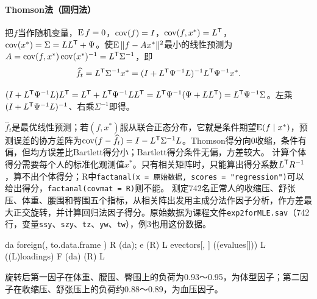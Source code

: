 \paragraph{Thomson法（回归法）} 把$f$当作随机变量，$\operatorname{E} f=0$，$\operatorname{cov}(f)=I$，$\operatorname{cov}(f,x^*)=L^{\mathsf T}$，$\operatorname{cov}(x^*)=\Sigma=LL^{\mathsf T}+\Psi$。使$\operatorname{E}\|f-Ax^*\|^2$最小的线性预测为$A=\operatorname{cov}(f,x^*)\operatorname{cov}(x^*)^{-1}=L^{\mathsf T}\Sigma^{-1}$，即
\begin{equation}
\widehat f_t=L^{\mathsf T}\Sigma^{-1}x^*=(I+L^{\mathsf T}\Psi^{-1}L)^{-1}L^{\mathsf T}\Psi^{-1}x^*.
\end{equation}
\begin{zm}[两种写法相等]
$(I+L^{\mathsf T}\Psi^{-1}L)L^{\mathsf T}=L^{\mathsf T}+L^{\mathsf T}\Psi^{-1}LL^{\mathsf T}=L^{\mathsf T}\Psi^{-1}(\Psi+LL^{\mathsf T})=L^{\mathsf T}\Psi^{-1}\Sigma$。左乘$(I+L^{\mathsf T}\Psi^{-1}L)^{-1}$、右乘$\Sigma^{-1}$即得。
\end{zm}
$\widehat f_t$是最优线性预测；若$(f,x^*)$服从联合正态分布，它就是条件期望$\operatorname{E}(f\mid x^*)$，预测误差的协方差阵为$\operatorname{cov}(f-\widehat f_t)=I-L^{\mathsf T}\Sigma^{-1}L$。Thomson得分向0收缩，条件有偏，但均方误差比Bartlett得分小；Bartlett得分条件无偏，方差较大。
计算个体得分需要每个人的标准化观测值$x^*$。只有相关矩阵时，只能算出得分系数$L^{\mathsf T} R^{-1}$，算不出个体得分；R中\texttt{factanal(x = 原始数据, scores = "regression")}可以给出得分，\texttt{factanal(covmat = R)}则不能。
测定742名正常人的收缩压、舒张压、体重、腰围和臀围五个指标，从相关阵出发用主成分法作因子分析，作方差最大正交旋转，并计算回归法因子得分。原始数据为课程文件\texttt{exp2forMLE.sav}（742行，变量\texttt{ssy}、\texttt{szy}、\texttt{tz}、\texttt{yw}、\texttt{tw}），例3也用这份数据。
\begin{code}
da \ROperator{<-} foreign\ROperator{::}(, to.data.frame \ROperator{=} )
R \ROperator{<-} (da); e \ROperator{<-} (R)                
L \ROperator{<-} e\ROperator{\$}vectors[, \ROperator{:}] \ROperator{\%*\%} ((e\ROperator{\$}values[\ROperator{:}]))   
L \ROperator{<-} ((L)\ROperator{\$}loadings)          
F \ROperator{<-} (da) \ROperator{\%*\%} (R) \ROperator{\%*\%} L         
\end{code}
旋转后第一因子在体重、腰围、臀围上的负荷为0.93～0.95，为体型因子；第二因子在收缩压、舒张压上的负荷约0.88～0.89，为血压因子。

